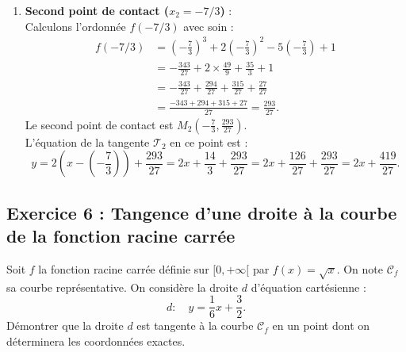 \documentclass[11pt,a4paper]{article}
\begin{document}
\begin{correctionbox}
\begin{enumerate}[label=\textbf{\arabic*.}]
    \item \textbf{Second point de contact ($x_2 = -7/3$)} :\\
    Calculons l'ordonnée $f(-7/3)$ avec soin :
    \begin{align*}
    f(-7/3) &= \left(-\frac{7}{3}\right)^3 + 2\left(-\frac{7}{3}\right)^2 - 5\left(-\frac{7}{3}\right) + 1 \\
    &= -\frac{343}{27} + 2 \times \frac{49}{9} + \frac{35}{3} + 1 \\
    &= -\frac{343}{27} + \frac{294}{27} + \frac{315}{27} + \frac{27}{27} \\
    &= \frac{-343 + 294 + 315 + 27}{27} = \frac{293}{27}.
    \end{align*}
    Le second point de contact est $M_2\left(-\frac{7}{3}, \frac{293}{27}\right)$.\\
    L'équation de la tangente $\mathcal{T}_2$ en ce point est :
    \[
    y = 2\left(x - \left(-\frac{7}{3}\right)\right) + \frac{293}{27} = 2x + \frac{14}{3} + \frac{293}{27} = 2x + \frac{126}{27} + \frac{293}{27} = 2x + \frac{419}{27}.
    \]
\end{enumerate}
\end{correctionbox}

\subsection*{Exercice 6 : Tangence d'une droite à la courbe de la fonction racine carrée}

Soit $f$ la fonction racine carrée définie sur $[0, +\infty[$ par $f(x) = \sqrt{x}$. On note $\mathcal{C}_f$ sa courbe représentative.
On considère la droite $d$ d'équation cartésienne :
\[
d : \quad y = \frac{1}{6}x + \frac{3}{2}.
\]
Démontrer que la droite $d$ est tangente à la courbe $\mathcal{C}_f$ en un point dont on déterminera les coordonnées exactes.
\end{document}
